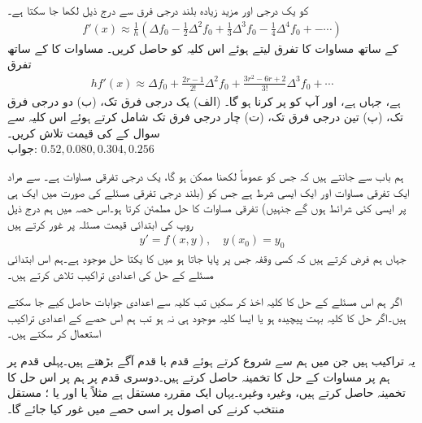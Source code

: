  کو یک درجی اور مزید زیادہ بلند درجی فرق سے درج ذیل لکھا جا سکتا ہے۔ 
\begin{align*}
f'(x)\approx \frac{1}{h}(\Delta f_0-\frac{1}{2}\Delta^2 f_0+\frac{1}{3}\Delta^3f_0-\frac{1}{4}\Delta^4 f_0+-\cdots)
\end{align*}
 کے ساتھ مساوات  کا  تفرق لیتے ہوئے اس کلیہ کو حاصل کریں۔ مساوات  کا  کے ساتھ تفرق
\begin{align*}
hf'(x)\approx \Delta f_0+\frac{2r-1}{2!}\Delta^2 f_0+\frac{3r^2-6r+2}{3!}\Delta^3f_0+\cdots
\end{align*}
ہے،  جہاں  ہے، اور آپ کو  پر کرنا ہو گا۔ (الف) یک درجی فرق تک، (ب) دو درجی فرق تک، (پ) تین درجی فرق تک، (ت) چار درجی فرق تک  شامل کرتے ہوئے  اس کلیہ سے  سوال  کے  کی قیمت تلاش کریں۔ \\
جواب:\quad
$0.52, 0.080, 0.304, 0.256$

ہم باب  سے جانتے ہیں کہ  جس کو عموماً  لکھنا ممکن ہو گا، یک درجی تفرقی مساوات ہے۔ سے مراد ایک تفرقی مساوات اور ایک ایسی شرط ہے  جس کو (بلند درجی تفرقی مسئلے کی صورت میں ایک ہی  پر ایسی کئی شرائط ہوں گے جنہیں) تفرقی مساوات کا حل مطمئن کرتا ہو۔اس حصہ میں ہم درج ذیل روپ کی ابتدائی قیمت مسئلہ پر غور کرتے ہیں
\begin{align}\label{مساوات_اعدادی_ابتدائی_مسئلہ_الف}
y'=f(x,y),\quad y(x_0)=y_0
\end{align}
جہاں ہم فرض کرتے ہیں کہ کسی وقفہ جس پر  پایا جاتا ہو میں  کا یکتا حل موجود ہے۔ہم اس ابتدائی مسئلے کے حل کی اعدادی تراکیب تلاش کرتے ہیں۔

اگر ہم اس مسئلے کے حل کا کلیہ اخذ کر سکیں تب کلیہ سے اعدادی جوابات حاصل کیے جا سکتے ہیں۔اگر حل کا کلیہ بہت پیچیدہ ہو یا ایسا کلیہ موجود ہی نہ ہو تب ہم اس حصے کے  اعدادی تراکیب استعمال کر سکتے ہیں۔

یہ تراکیب  ہیں جن میں ہم   سے شروع کرتے ہوئے قدم با قدم آگے بڑھتے ہیں۔پہلی قدم پر ہم   پر مساوات  کے حل  کا تخمینہ  حاصل کرتے ہیں۔دوسری قدم پر ہم   پر اس حل کا تخمینہ  حاصل کرتے ہیں، وغیرہ وغیرہ۔یہاں  ایک مقررہ مستقل ہے مثلاً  یا  اور یا ؛ مستقل  منتخب کرنے کی اصول پر اسی حصے میں غور کیا جائے گا۔


